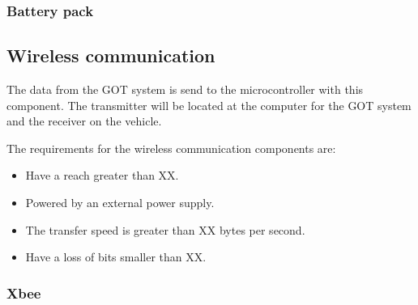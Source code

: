 \subsubsection{Battery pack}


\subsection{Wireless communication}
The data from the GOT system is send to the microcontroller with this component. The transmitter will be located at the computer for the GOT system and the receiver on the vehicle.

The requirements for the wireless communication components are:
\begin{itemize}
\item Have a reach greater than XX. 
\item Powered by an external power supply.
\item The transfer speed is greater than XX bytes per second. 
\item Have a loss of bits smaller than XX. 
\end{itemize}

\subsubsection{Xbee}


%
%

